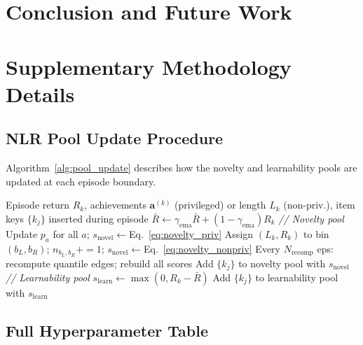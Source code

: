 \documentclass{article}
\begin{document}
\section{Conclusion and Future Work}
\label{sec:conclusion}






\appendix

\section{Supplementary Methodology Details}

\subsection{NLR Pool Update Procedure}
\label{app:pool_update}

Algorithm~\ref{alg:pool_update} describes how the novelty and
learnability pools are updated at each episode boundary.

\begin{algorithm}[h]
\caption{NLR pool update (per completed episode)}
\label{alg:pool_update}
\begin{algorithmic}[1]
\REQUIRE Episode return $R_k$, achievements $\bm{a}^{(k)}$
  (privileged) or length $L_k$ (non-priv.),
  item keys $\{k_j\}$ inserted during episode
\STATE $\bar{R}\leftarrow\gamma_{\mathrm{ema}}\bar{R}
  +(1{-}\gamma_{\mathrm{ema}})R_k$
\STATE \textit{// Novelty pool}
  \STATE Update $p_a$ for all $a$;\;
    $s_{\mathrm{novel}}\leftarrow$Eq.~\eqref{eq:novelty_priv}
\ELSE
  \STATE Assign $(L_k,R_k)$ to bin $(b_L,b_R)$;\;
    $n_{b_L,b_R}\mathrel{{+}{=}}1$;\;
    $s_{\mathrm{novel}}\leftarrow$Eq.~\eqref{eq:novelty_nonpriv}
  \STATE Every $N_{\mathrm{recomp}}$ eps: recompute quantile edges;\;
    rebuild all scores
\ENDIF
{}
  \STATE Add $\{k_j\}$ to novelty pool with $s_{\mathrm{novel}}$
\ENDIF
\STATE \textit{// Learnability pool}
\STATE $s_{\mathrm{learn}}\leftarrow\max(0,R_k{-}\bar{R})$
  \STATE Add $\{k_j\}$ to learnability pool with $s_{\mathrm{learn}}$
\ENDIF
\end{algorithmic}
\end{algorithm}

\subsection{Full Hyperparameter Table}
\label{app:hyperparams}
\end{document}
